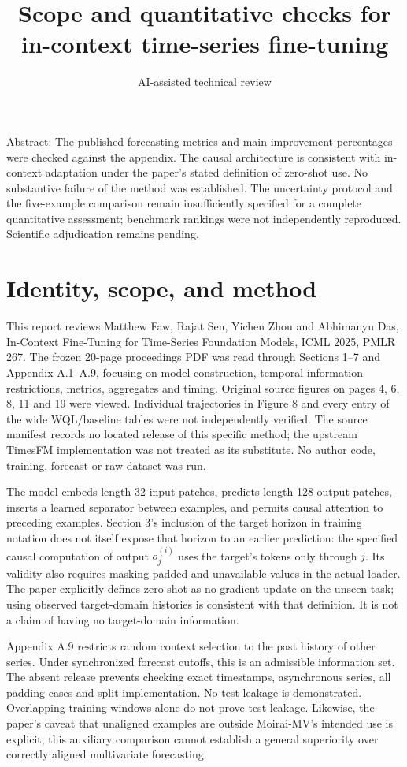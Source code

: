 \documentclass[10pt]{article}
\title{Scope and quantitative checks for in-context time-series fine-tuning}
\author{AI-assisted technical review}
\date{}
\begin{document}
\maketitle
Abstract: The published forecasting metrics and main improvement percentages were checked against the appendix. The causal architecture is consistent with in-context adaptation under the paper’s stated definition of zero-shot use. No substantive failure of the method was established. The uncertainty protocol and the five-example comparison remain insufficiently specified for a complete quantitative assessment; benchmark rankings were not independently reproduced. Scientific adjudication remains pending.\par
\section*{Identity, scope, and method}
This report reviews Matthew Faw, Rajat Sen, Yichen Zhou and Abhimanyu Das, In-Context Fine-Tuning for Time-Series Foundation Models, ICML 2025, PMLR 267. The frozen 20-page proceedings PDF was read through Sections 1–7 and Appendix A.1–A.9, focusing on model construction, temporal information restrictions, metrics, aggregates and timing. Original source figures on pages 4, 6, 8, 11 and 19 were viewed. Individual trajectories in Figure 8 and every entry of the wide WQL/baseline tables were not independently verified. The source manifest records no located release of this specific method; the upstream TimesFM implementation was not treated as its substitute. No author code, training, forecast or raw dataset was run.\par
The model embeds length-32 input patches, predicts length-128 output patches, inserts a learned separator between examples, and permits causal attention to preceding examples. Section 3’s inclusion of the target horizon in training notation does not itself expose that horizon to an earlier prediction: the specified causal computation of output \(o_j^{(i)}\) uses the target’s tokens only through \(j\). Its validity also requires masking padded and unavailable values in the actual loader. The paper explicitly defines zero-shot as no gradient update on the unseen task; using observed target-domain histories is consistent with that definition. It is not a claim of having no target-domain information.\par
Appendix A.9 restricts random context selection to the past history of other series. Under synchronized forecast cutoffs, this is an admissible information set. The absent release prevents checking exact timestamps, asynchronous series, all padding cases and split implementation. No test leakage is demonstrated. Overlapping training windows alone do not prove test leakage. Likewise, the paper’s caveat that unaligned examples are outside Moirai-MV’s intended use is explicit; this auxiliary comparison cannot establish a general superiority over correctly aligned multivariate forecasting.\par
\end{document}
